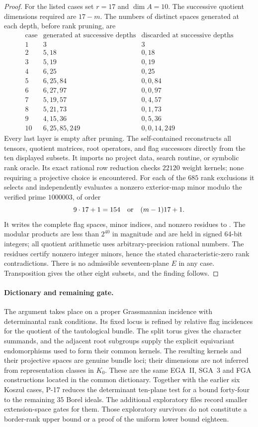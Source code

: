 \begin{proof}
For the listed cases set $r=17$ and $\dim A=10$. The successive
quotient dimensions required are $17-m$. The numbers of distinct
spaces generated at each depth, before rank pruning, are
\[
\begin{array}{c|l|l}
 \text{case}&\text{generated at successive depths}
             &\text{discarded at successive depths}\\\hline
 1&3&3\\
 2&5,18&0,18\\
 3&5,19&0,19\\
 4&6,25&0,25\\
 5&6,25,84&0,0,84\\
 6&6,27,97&0,0,97\\
 7&5,19,57&0,4,57\\
 8&5,21,73&0,1,73\\
 9&4,15,36&0,5,36\\
 10&6,25,85,249&0,0,14,249
\end{array}
\]
Every last layer is empty after pruning. The self-contained
 reconstructs all tensors, quotient
matrices, root operators, and flag successors directly from the ten
displayed subsets. It imports no project data, search routine, or
symbolic rank oracle. Its exact rational row reduction checks
$22120$ weight kernels; none requiring a projective choice is
encountered. For each of the $685$ rank exclusions it selects and
independently evaluates a nonzero exterior-map minor modulo the
verified prime $1000003$, of order
\[
 9\cdot17+1=154\quad\hbox{or}\quad(m-1)17+1.
\]
It writes the complete flag spaces, minor indices, and nonzero residues
to . The modular products are less
than $2^{40}$ in magnitude and are held in signed 64-bit integers;
all quotient arithmetic uses arbitrary-precision rational numbers.
The residues certify nonzero integer minors, hence the stated
characteristic-zero rank contradictions. There is no admissible
seventeen-plane $E$ in any case. Transposition gives the other eight
subsets, and the finding follows.
\end{proof}

\paragraph{Dictionary and remaining gate.}
The argument takes place on a proper Grassmannian incidence with
determinantal rank conditions. Its fixed locus is refined by relative
flag incidences for the quotient of the tautological bundle. The
split torus gives the character summands, and the adjacent root
subgroups supply the explicit equivariant endomorphisms used to form
their common kernels. The resulting kernels and their projective
spaces are genuine bundle loci; their dimensions are not inferred
from representation classes in $K_0$. These are the same EGA~II,
SGA~3 and FGA constructions located in the common dictionary.
Together with the earlier six Koszul cases, P-17 reduces the
determinant ten-plane test for a bound forty-four to the remaining
$35$ Borel ideals. The additional exploratory files record smaller
extension-space gates for them. Those exploratory survivors do not
constitute a border-rank upper bound or a proof of the uniform lower
bound eighteen.
